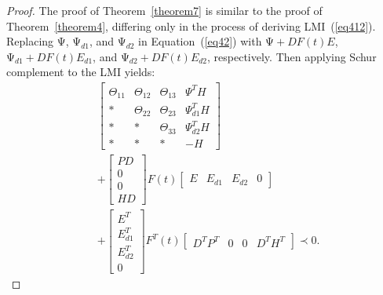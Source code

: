 \documentclass[journal]{IEEEtran}
\begin{document}
\begin{proof}
  The proof of Theorem~\ref{theorem7} is similar to the proof of Theorem~\ref{theorem4}, differing only in the process of deriving LMI~(\ref{eq412}). Replacing $\mathrm{\Psi}$, $\mathrm{\Psi}_{d1}$, and $\mathrm{\Psi}_{d2}$ in Equation~(\ref{eq42}) with $\mathrm{\Psi}+DF(t)E$, $\mathrm{\Psi}_{d1}+DF(t)E_{d1}$, and $\mathrm{\Psi}_{d2}+DF(t)E_{d2}$, respectively. Then applying Schur complement to the LMI yields:
  \begin{equation}
    \begin{aligned}
    &\left[ {\begin{array}{*{20}{c}}
            {{\Theta _{11}}} & {{\Theta _{12}}} & {{\Theta _{13}}} & {{\Psi ^T}H}    \\
            *                & {{\Theta _{22}}} & {{\Theta _{23}}} & {\Psi _{d1}^TH} \\
            *                & *                & {{\Theta _{33}}} & {\Psi _{d2}^TH} \\
            *                & *                & *                & { - H}
          \end{array}} \right] \\&+ \left[ {\begin{array}{*{20}{c}}
            {PD} \\
            0    \\
            0    \\
            {HD}
          \end{array}} \right]F(t)\left[ {\begin{array}{*{20}{c}}
            E & {{E_{d1}}} & {{E_{d2}}} & 0
          \end{array}} \right] \\&+ \left[ {\begin{array}{*{20}{c}}
            {{E^T}}    \\
            {E_{d1}^T} \\
            {E_{d2}^T} \\
            0
          \end{array}} \right]{F^T}(t)\left[ {\begin{array}{*{20}{c}}
            {{D^T}{P^T}} & 0 & 0 & {{D^T}{H^T}}
          \end{array}} \right] \prec 0.
        \end{aligned}
    \label{eq413}
  \end{equation}


\end{proof}
\end{document}
